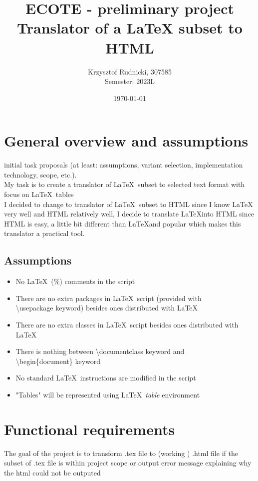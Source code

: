 \documentclass[12pt]{article}
\date{\today}
\title{ECOTE - preliminary project \\ 
Translator of a LaTeX subset to HTML
}
\author{Krzysztof Rudnicki, 307585 \\
Semester: 2023L}
\begin{document}
\maketitle
\section{General overview and assumptions}
initial task proposals (at least: assumptions, variant selection, implementation technology, scope, etc.). \\
My task is to create a translator of \LaTeX \, subset to selected text format with focus on \LaTeX \, tables \\ 
I decided to change to translator of \LaTeX \, subset to HTML since I know \LaTeX \, very well and HTML relatively well, I decide to translate \LaTeX into HTML since HTML is easy, a little bit different than \LaTeX and popular which makes this translator a practical tool.
\subsection{Assumptions}
\begin{itemize}
    \item No \LaTeX \, (\%) comments in the script 
    \item There are no extra packages in \LaTeX \, script (provided with \\ \textbackslash usepackage keyword) besides ones distributed with \LaTeX
    \item There are no extra classes in \LaTeX \, script besides ones distributed with \LaTeX
    \item There is nothing between \textbackslash documentclass keyword and \\ \textbackslash begin\{document\} keyword 
    \item No standard \LaTeX \, instructions are modified in the script
    \item "Tables" will be represented using \LaTeX \, \emph{table} environment 
\end{itemize}
\section{Functional requirements}
The goal of the project is to transform .tex file to (working ) .html file if the subset of .tex file is within project scope or output error message explaining why the html could not be outputed
\end{document}

